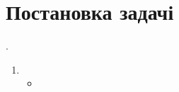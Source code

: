 \documentclass[\mainDocument]{subfiles}
\begin{document}
\BeforeChpater{}

\chapter{Постановка задачі}
 \worktheme.\\
\begin{enumerate}
	\item
		\begin{itemize}
			\item 
		\end{itemize}
\end{enumerate}

\AfterChapter{}
\end{document}
